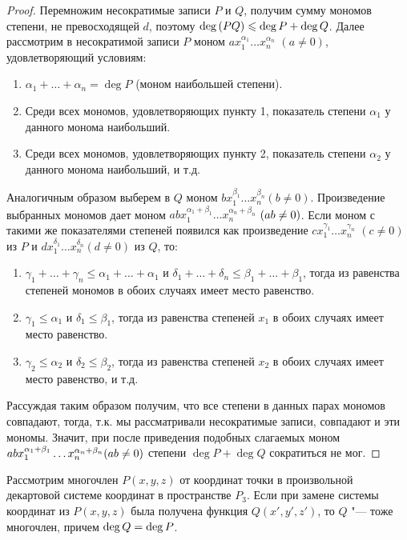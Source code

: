 \begin{proof}
	Перемножим несократимые записи $P$ и $Q$, получим сумму мономов степени, не превосходящей $d$, поэтому $\deg{(PQ)} \hm{\le} \deg{P} + \deg{Q}$. Далее рассмотрим в несократимой записи $P$ моном $ax_1^{\alpha_1}\dots x_n^{\alpha_n}$ $(a \ne 0)$, удовлетворяющий условиям:
	\begin{enumerate}
		\item $\alpha_1 + \dots + \alpha_n = \deg{P}$ (моном наибольшей степени).
		\item Среди всех мономов, удовлетворяющих пункту 1, показатель степени $\alpha_1$ у данного монома наибольший.
		\item Среди всех мономов, удовлетворяющих пункту 2, показатель степени $\alpha_2$ у данного монома наибольший, и т.\:д.
	\end{enumerate}
	
	Аналогичным образом выберем в $Q$ моном $bx_1^{\beta_1}\dots x_n^{\beta_n} (b \ne 0)$. Произведение выбранных мономов дает моном $abx_1^{\alpha_1+\beta_1}\dots x_n^{\alpha_n+\beta_n}$ $(ab \hm{\ne} 0)$. Если моном с такими же показателями степеней появился как произведение $cx_1^{\gamma_1}\dots x_n^{\gamma_n}$ $(c \ne 0)$ из $P$ и $dx_1^{\delta_1}\dots x_n^{\delta_n} (d \ne 0)$ из $Q$, то:
	\begin{enumerate}
		\item $\gamma_1 + \dots + \gamma_n \le \alpha_1 + \dots + \alpha_1$ и $\delta_1 + \dots + \delta_n \le \beta_1 + \dots + \beta_1$, тогда из равенства степеней мономов в обоих случаях имеет место равенство.
		\item $\gamma_1 \le \alpha_1$ и $\delta_1 \le \beta_1$, тогда из равенства степеней $x_1$ в обоих случаях имеет место равенство.
		\item $\gamma_2 \le \alpha_2$ и $\delta_2 \le \beta_2$, тогда из равенства степеней $x_2$ в обоих случаях имеет место равенство, и т.\:д.
	\end{enumerate}
	
	Рассуждая таким образом получим, что все степени в данных парах мономов совпадают, тогда, т.\:к. мы рассматривали несократимые записи, совпадают и эти мономы. Значит, при после приведения подобных слагаемых моном $abx_1^{\alpha_1+\beta_1}\dots x_n^{\alpha_n+\beta_n} (ab \hm{\ne} 0)$ степени $\deg{P} + \deg{Q}$ сократиться не мог.
\end{proof}

\begin{theorem}
	Рассмотрим многочлен $P(x, y, z)$ от координат точки в произвольной декартовой системе координат в пространстве $P_3$. Если при замене системы координат из $P(x, y, z)$ была получена функция $Q(x', y', z')$, то $Q$ "--- тоже многочлен, причем $\deg{Q} \hm{=} \deg{P}$.
\end{theorem}

